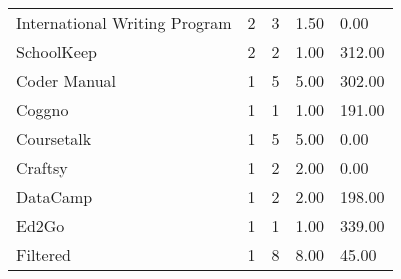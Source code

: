 \documentclass[
	a4paper,
	pdftex,
	12pt,	
	footinclude=true,
	fleqn,
	final,
	]{report}%
\begin{document}
\begin{table}[h]
{\begin{tabular}{m{7cm} m{2.3cm} m{2.3cm} m{2.3cm} m{2.3cm}}
International Writing Program & 2                                                    & 3                                                     & 1.50                                                     & 0.00                                                     \\
SchoolKeep                    & 2                                                    & 2                                                     & 1.00                                                     & 312.00                                                   \\
Coder Manual                  & 1                                                    & 5                                                     & 5.00                                                     & 302.00                                                   \\
Coggno                        & 1                                                    & 1                                                     & 1.00                                                     & 191.00                                                   \\
Coursetalk                    & 1                                                    & 5                                                     & 5.00                                                     & 0.00                                                     \\
Craftsy                       & 1                                                    & 2                                                     & 2.00                                                     & 0.00                                                     \\
DataCamp                      & 1                                                    & 2                                                     & 2.00                                                     & 198.00                                                   \\
Ed2Go                         & 1                                                    & 1                                                     & 1.00                                                     & 339.00                                                   \\
Filtered                      & 1                                                    & 8                                                     & 8.00                                                     & 45.00                                                    \\

\end{tabular}}
\end{table}
\end{document}
